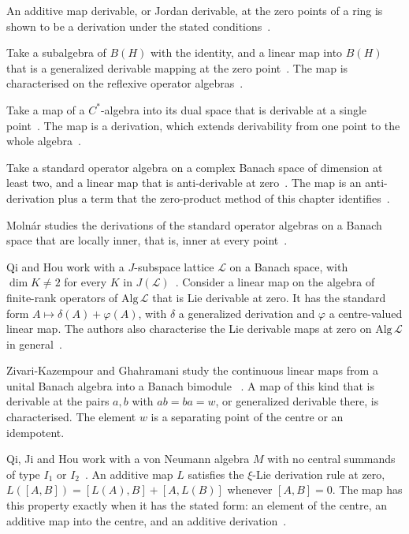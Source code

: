 An additive map derivable, or Jordan derivable, at the zero points of a ring
is shown to be a derivation under the stated
conditions~\cite{WlAdditiveMapsDerivableOrJordanD2010}.

Take a subalgebra of $B(H)$ with the identity, and a linear map into $B(H)$
that is a generalized derivable mapping at the zero point~\cite{WlGeneralizedDerivableMappingsAt2019}. The map is
characterised on the reflexive operator
algebras~\cite{WlGeneralizedDerivableMappingsAt2019}.

Take a map of a $C^*$-algebra into its dual space that is derivable at a
single
point~\cite{WlDualSpaceValuedMappingsOnCAlge2019}. The map is a derivation, which extends derivability from one point
to the whole algebra~\cite{WlDualSpaceValuedMappingsOnCAlge2019}.

Take a standard operator algebra on a complex Banach space of dimension at
least two, and a linear map that is anti-derivable at zero~\cite{WlAntiDerivableLinearMapsAtZeroO2019}. The map is an
anti-derivation plus a term that the zero-product method of this chapter
identifies~\cite{WlAntiDerivableLinearMapsAtZeroO2019}.

Moln\'ar studies the derivations of the standard operator algebras on a Banach
space that are locally inner, that is, inner at every
point~\cite{WlLocallyInnerDerivationsOfStand1996}.

Qi and Hou work with a $J$-subspace lattice $\mathcal{L}$ on a Banach
space, with $\dim K\neq 2$ for every $K$ in $J(\mathcal{L})$~\cite{WlLinearMapsLieDerivableAtZeroOn2010}. Consider a linear
map on the algebra of finite-rank operators of $\mathrm{Alg}\,\mathcal{L}$ that
is Lie derivable at zero. It has the standard form $A\mapsto\delta(A)+\varphi(A)$,
with $\delta$ a generalized derivation and $\varphi$ a centre-valued
linear map. The authors also characterise the Lie derivable maps at zero on
$\mathrm{Alg}\,\mathcal{L}$ in
general~\cite{WlLinearMapsLieDerivableAtZeroOn2010}.

Zivari-Kazempour and Ghahramani study the continuous linear maps
from a unital Banach algebra into a Banach bimodule
~\cite{WlDerivableMapsAtCommutativeProd2024}. A map of this kind that is
derivable at the pairs $a,b$ with $ab=ba=w$, or generalized derivable there,
is characterised. The element $w$ is a separating point of the centre or an
idempotent.

Qi, Ji and Hou work with a von Neumann algebra $M$ with no central summands of
type $I_1$ or $I_2$~\cite{WlCharacterizationOfAdditiveMaps2015}. An additive map $L$ satisfies the $\xi$-Lie
derivation rule at zero, $L([A,B])=[L(A),B]+[A,L(B)]$ whenever $[A,B]=0$. The
map has this property exactly when it has the stated form: an element of the
centre, an additive map into the centre, and an additive
derivation~\cite{WlCharacterizationOfAdditiveMaps2015}.
